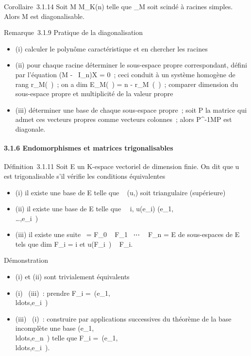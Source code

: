 \documentclass[]{article}
\begin{document}
Corollaire~3.1.14 Soit M \in M_K(n) telle que \chi_M soit
scindé à racines simples. Alors M est diagonalisable.

Remarque~3.1.9 Pratique de la diagonalisation

\begin{itemize}
\itemsep1pt\parskip0pt
\item
  (i) calculer le polynôme caractéristique et en chercher les racines
\item
  (ii) pour chaque racine déterminer le sous-espace propre
  correspondant, défini par l'équation (M - \lambda~I_n)X = 0~; ceci
  conduit à un système homogène de rang r_M(\lambda~)~; on a
  dim E_M(\lambda~) = n - r_M~(\lambda~)~;
  comparer dimension du sous-espace propre et multiplicité de la valeur
  propre
\item
  (iii) déterminer une base de chaque sous-espace propre~; soit P la
  matrice qui admet ces vecteurs propres comme vecteurs colonnes~; alors
  P^-1MP est diagonale.
\end{itemize}

\paragraph{3.1.6 Endomorphismes et matrices trigonalisables}

Définition~3.1.11 Soit E un K-espace vectoriel de dimension finie. On
dit que u est trigonalisable s'il vérifie les conditions équivalentes

\begin{itemize}
\itemsep1pt\parskip0pt
\item
  (i) il existe une base  de E telle que
  \mathrmMat~ (u,) soit
  triangulaire (supérieure)
\item
  (ii) il existe une base  de E telle que \forall~~i,
  u(e_i)
  \in\mathrmVect(e_1,\\\ldots,e_i~)
\item
  (iii) il existe une suite \0\ =
  F_0 \subset~ F_1 \subset~⋯ \subset~
  F_n = E de sous-espaces de E tels que
  dim F_i = i et u(F_i~) \subset~
  F_i.
\end{itemize}

Démonstration

\begin{itemize}
\itemsep1pt\parskip0pt
\item
  (i) et (ii) sont trivialement équivalents
\item
  (i) \rigtharrow~(iii)~: prendre F_i =\
  \mathrmVect(e_1,\\ldots,e_i~)
\item
  (iii) \rigtharrow~(i)~: construire par applications successives du théorème de la
  base incomplète une base
  (e_1,\\ldots,e_n~)
  telle que F_i =\
  \mathrmVect(e_1,\\ldots,e_i~).
\end{itemize}
\end{document}
